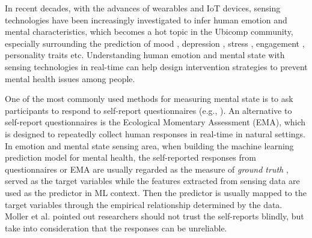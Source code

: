 \documentclass[sigconf]{acmart}
\begin{document}
In recent decades, with the advances of wearables and IoT devices, sensing technologies have been increasingly investigated to infer human emotion and mental characteristics, which becomes a hot topic in the Ubicomp community, especially surrounding the prediction of mood \cite{Moodexplorer,morshed2019prediction}, depression \cite{wang2018trackingdepression,xu2019leveragingdepression}, stress \cite{king2019microstress}, engagement \cite{gao2020n,huynh2018engagemon,di2018engagement}, personality traits \cite{personalitysensing2018wang,gao2019predicting} etc. Understanding human emotion and mental state with sensing technologies in real-time can help design intervention strategies to prevent mental health issues among people. 

One of the most commonly used methods for measuring mental state is to ask participants to respond to self-report questionnaires (e.g., \cite{gao2020n, gao2019predicting,di2018engagement,gashi2019using}). An alternative to self-report questionnaires is the Ecological Momentary Assessment (EMA), which is designed to repeatedly collect human responses in real-time in natural settings. In emotion and mental state sensing area, when building the machine learning prediction model for mental health, the self-reported responses from questionnaires or EMA are usually regarded as the measure of \textit{ground truth} \cite{king2019microstress,di2018engagement,gao2020n,wang2014studentlife,Moodexplorer}, served as the target variables while the features extracted from sensing data are used as the predictor in ML context. Then the predictor is usually mapped to the target variables through the empirical relationship determined by the data. Moller et al. \cite{moller2013investigating} pointed out researchers should not trust the self-reports blindly, but take into consideration that the responses can be unreliable.





\end{document}
